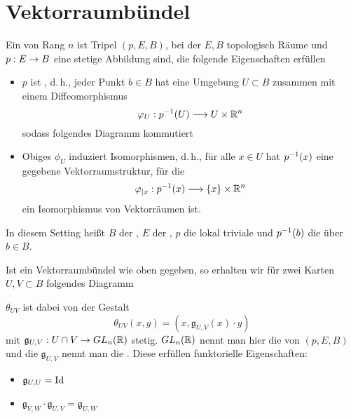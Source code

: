 \section{Vektorraumbündel}
\Def{}
Ein  von Rang $n$ ist Tripel $(p,E,B)$, bei der $E,B$ topologisch Räume und $ p:E\overset{}{\rightarrow} B$ eine stetige Abbildung sind, die folgende Eigenschaften erfüllen
\begin{itemize}
	\item $p$ ist , d.\,h., jeder Punkt $b \in B$ hat eine Umgebung $U\subset B$ zusammen mit einem Diffeomorphismus
	\[ \varphi_U : p^{-1}(U) \overset{}{\longrightarrow} U \times \mathbb{R}^n \]
	sodass folgendes Diagramm kommutiert
		\begin{center}
	\end{center}
	\item Obiges $\phi_U$ induziert  Isomorphismen, d.\,h., für alle $x\in U$ hat $p^{-1}(x)$ eine gegebene Vektorraumstruktur, für die
	\[ \varphi_{|x} : p^{-1}(x) \overset{}{\longrightarrow}  \{x\}\times \mathbb{R}^n \]
	ein Isomorphismus von Vektorräumen ist.
\end{itemize}
In diesem Setting heißt $B$ der , $E$ der , $p$ die lokal triviale  und $p^{-1}(b)$ die  über $b \in B$.

\Bem{}
Ist ein Vektorraumbündel wie oben gegeben, so erhalten wir für zwei Karten $U,V\subset B$ folgendes Diagramm
\begin{center}
\end{center}
$\theta_{UV}$ ist dabei von der Gestalt
\[ \theta_{UV}(x,y) = (x, \mathfrak{g}_{U,V}(x)\cdot y) \]
mit $\mathfrak{g}_{U,V} : U\cap V \overset{}{\rightarrow} GL_n(\mathbb{R})$ stetig. $GL_n(\mathbb{R})$ nennt man hier die  von $(p,E,B)$ und die $\mathfrak{g}_{U,V}$ nennt man die . Diese erfüllen funktorielle Eigenschaften:
\begin{itemize}
	\item $\mathfrak{g}_{U,U} = \text{Id}_{}$
	\item $\mathfrak{g}_{V,W} \cdot \mathfrak{g}_{U,V}  = \mathfrak{g}_{U,W}$
\end{itemize}

